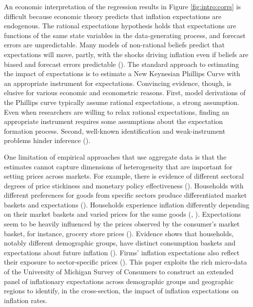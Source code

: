 \documentclass[12pt]{article}
\begin{document}
An economic interpretation of the regression results in Figure \ref{fig:intro:corrs} is difficult because economic theory predicts that inflation expectations are endogenous. The rational expectations hypothesis holds that expectations are functions of the same state variables in the data-generating process, and forecast errors are unpredictable. Many models of non-rational beliefs predict that expectations will move, partly, with the shocks driving inflation even if beliefs are biased and forecast errors predictable (\cite{SophoclesJME}). The standard approach to estimating the impact of expectations is to estimate a New Keynesian Phillips Curve with an appropriate instrument for expectations. Convincing evidence, though, is elusive for various economic and econometric reasons. First, model derivations of the Phillips curve typically assume rational expectations, a strong assumption. Even when researchers are willing to relax rational expectations, finding an appropriate instrument requires some assumptions about the expectation formation process. Second, well-known identification and weak-instrument problems hinder inference (\cite{Stocketal:JEL2014}).

One limitation of empirical approaches that use aggregate data is that the estimates cannot capture dimensions of heterogeneity that are important for setting prices across markets. For example, there is evidence of different sectoral degrees of price stickiness and monetary policy effectiveness (\cite{Cravinoetal:JME2020, Boivinetal:AER2009, Almas:AER2012}). Households with different preferences for goods from specific sectors produce differentiated market baskets and expectations (\cite{AngelicoGiacomo:WP}). Households experience inflation differently depending on their market baskets and varied prices for the same goods (\cite{KaplanWohl:JME2017}, \cite{HobijnLagakos:2005}). Expectations seem to be heavily influenced by the prices observed by the consumer's market basket, for instance, grocery store prices (\cite{Dacunto:groceryJPE, AngelicoGiacomo:WP}). Evidence shows that households, notably different demographic groups, have distinct consumption baskets and expectations about future inflation (\cite{BryanVenkatu, Dacunto:PNAS, deBruinetal:2010, DasKahnenNagel:2020}). Firms' inflation expectations also reflect their exposure to sector-specific prices (\cite{Andradeetal:JME2021}). This paper exploits the rich micro-data of the University of Michigan Survey of Consumers to construct an extended panel of inflationary expectations across demographic groups and geographic regions to identify, in the cross-section, the impact of inflation expectations on inflation rates.
\end{document}

